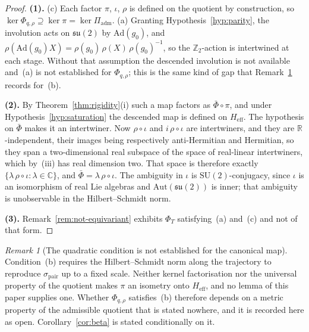 \documentclass[11pt,a4paper]{article}
\theoremstyle{remark}
\newtheorem{remark}[theorem]{Remark}
\begin{document}
  \begin{proof}
    \textbf{(1).}
    (c) Each factor $\pi$, $\iota$, $\rho$ is defined on the quotient by construction, so
    $\ker \Phi_{q,\rho} \supseteq \ker \pi = \ker \Pi_{\mathrm{adm}}$.
    (a) Granting Hypothesis~\ref{hyp:parity}, the involution acts on $\mathfrak{su}(2)$ by
    $\mathrm{Ad}(g_0)$, and $\rho(\mathrm{Ad}(g_0) X) = \rho(g_0)\,\rho(X)\,\rho(g_0)^{-1}$, so
    the $\mathbb{Z}_2$-action is intertwined at each stage.
    Without that assumption the descended involution is not available and~(a) is not established
    for $\Phi_{q,\rho}$; this is the same kind of gap that Remark~\ref{rem:norm-open} records
    for~(b).

    \textbf{(2).}
    By Theorem~\ref{thm:rigidity}(i) such a map factors as $\bar\Phi \circ \pi$, and under
    Hypothesis~\ref{hyp:saturation} the descended map is defined on $H_{\mathrm{eff}}$.
    The hypothesis on $\bar\Phi$ makes it an intertwiner.
    Now $\rho \circ \iota$ and $i\,\rho \circ \iota$ are intertwiners, and they are
    $\mathbb{R}$-independent, their images being respectively anti-Hermitian and Hermitian, so they
    span a two-dimensional real subspace of the space of real-linear intertwiners, which by~(iii)
    has real dimension two.
    That space is therefore exactly
    $\{\lambda\,\rho \circ \iota : \lambda \in \mathbb{C}\}$, and
    $\bar\Phi = \lambda\,\rho \circ \iota$.
    The ambiguity in $\iota$ is $\mathrm{SU}(2)$-conjugacy, since $\iota$ is an isomorphism of
    real Lie algebras and $\mathrm{Aut}(\mathfrak{su}(2))$ is inner; that ambiguity is
    unobservable in the Hilbert--Schmidt norm.

    \textbf{(3).}
    Remark~\ref{rem:not-equivariant} exhibits $\Phi_T$ satisfying~(a) and~(c) and not of that form.
  \end{proof}

  \begin{remark}[The quadratic condition is not established for the canonical map]
    \label{rem:norm-open}
    Condition~(b) requires the Hilbert--Schmidt norm along the trajectory to reproduce
    $\sigma_{\mathrm{pair}}$ up to a fixed scale.
    Neither kernel factorisation nor the universal property of the quotient makes $\pi$ an isometry
    onto $H_{\mathrm{eff}}$, and no lemma of this paper supplies one.
    Whether $\Phi_{q,\rho}$ satisfies~(b) therefore depends on a metric property of the admissible
    quotient that is stated nowhere, and it is recorded here as open.
    Corollary~\ref{cor:beta} is stated conditionally on it.
  \end{remark}
\end{document}
